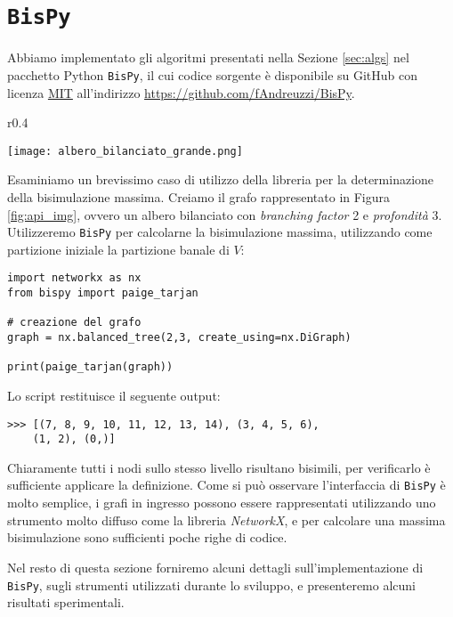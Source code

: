 \section{\texttt{BisPy}}
\label{sec:bispy}
Abbiamo implementato gli algoritmi presentati nella Sezione \ref{sec:algs} nel pacchetto Python \texttt{BisPy}, il cui codice sorgente è disponibile su GitHub con licenza \href{https://github.com/fAndreuzzi/BisPy/blob/master/LICENSE}{MIT} all'indirizzo \href{https://github.com/fAndreuzzi/BisPy}{https://github.com/fAndreuzzi/BisPy}.

\begin{wrapfigure}{r}{0.4\textwidth}
    \vspace{-1cm}
    \begin{center}
        \texttt{[image: albero\_bilanciato\_grande.png]}
    \end{center}
    \caption{}
    \label{fig:api_img}
\end{wrapfigure}
Esaminiamo un brevissimo caso di utilizzo della libreria per la determinazione della bisimulazione massima. Creiamo il grafo rappresentato in Figura \ref{fig:api_img}, ovvero un albero bilanciato con \emph{branching factor} 2 e \emph{profondità} 3. Utilizzeremo \texttt{BisPy} per calcolarne la bisimulazione massima, utilizzando come partizione iniziale la partizione banale di $V$:
\begin{verbatim}
import networkx as nx
from bispy import paige_tarjan

# creazione del grafo
graph = nx.balanced_tree(2,3, create_using=nx.DiGraph)

print(paige_tarjan(graph))
\end{verbatim}
Lo script restituisce il seguente output:
\begin{verbatim}
>>> [(7, 8, 9, 10, 11, 12, 13, 14), (3, 4, 5, 6),
    (1, 2), (0,)]
\end{verbatim}
Chiaramente tutti i nodi sullo stesso livello risultano bisimili, per verificarlo è sufficiente applicare la definizione. Come si può osservare l'interfaccia di \texttt{BisPy} è molto semplice, i grafi in ingresso possono essere rappresentati utilizzando uno strumento molto diffuso come la libreria \emph{NetworkX}, e per calcolare una massima bisimulazione sono sufficienti poche righe di codice.

Nel resto di questa sezione forniremo alcuni dettagli sull'implementazione di \texttt{BisPy}, sugli strumenti utilizzati durante lo sviluppo, e presenteremo alcuni risultati sperimentali.




